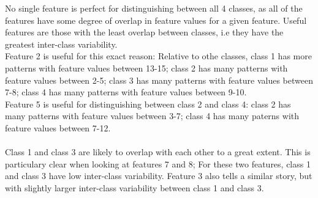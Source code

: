 \documentclass[a4paper,12pt]{article}
\begin{document}
No single feature is perfect for distinguishing between all 4 classes, as all of the features have some degree of overlap in feature values for a given feature. Useful features are those with the least overlap between classes, i.e they have the greatest inter-class variability.\\
Feature 2 is useful for this exact reason: Relative to othe classes, class 1 has more patterns with feature values between 13-15; class 2 has many patterns with feature values between 2-5; class 3 has many patterns with feature values between 7-8; class 4 has many patterns with feature values between 9-10. \\
Feature 5 is useful for distinguishing between class 2 and class 4: class 2 has many patterns with feature values between 3-7; class 4 has many paterns with feature values between 7-12. \\ \\
Class 1 and class 3 are likely to overlap with each other to a great extent. This is particulary clear when looking at features 7 and 8; For these two features, class 1 and class 3 have low inter-class variability. Feature 3 also tells a similar story, but with slightly larger inter-class variability between class 1 and class 3. \\
\end{document}
